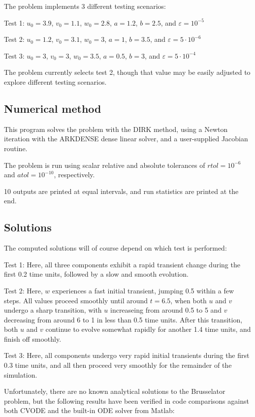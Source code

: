 \documentclass[letterpaper,10pt,english]{sphinxmanual}
\begin{document}
The problem implements 3 different testing scenarios:

Test 1:  \(u_0=3.9\),  \(v_0=1.1\),  \(w_0=2.8\),
\(a=1.2\), \(b=2.5\), and \(\varepsilon=10^{-5}\)

Test 2:  \(u_0=1.2\), \(v_0=3.1\), \(w_0=3\), \(a=1\),
\(b=3.5\), and \(\varepsilon=5\cdot10^{-6}\)

Test 3:  \(u_0=3\), \(v_0=3\), \(w_0=3.5\), \(a=0.5\),
\(b=3\), and \(\varepsilon=5\cdot10^{-4}\)

The problem currently selects test 2, though that value may be easily
adjusted to explore different testing scenarios.


\subsection{Numerical method}
\label{c_serial:id6}
This program solves the problem with the DIRK method, using a
Newton iteration with the ARKDENSE dense linear solver, and a
user-supplied Jacobian routine.

The problem is run using scalar relative and absolute tolerances of
\(rtol=10^{-6}\) and \(atol=10^{-10}\), respectively.

10 outputs are printed at equal intervals, and run statistics
are printed at the end.


\subsection{Solutions}
\label{c_serial:id7}
The computed solutions will of course depend on which test is
performed:

Test 1:  Here, all three components exhibit a rapid transient change
during the first 0.2 time units, followed by a slow and smooth evolution.

Test 2: Here, \(w\) experiences a fast initial transient, jumping
0.5 within a few steps.  All values proceed smoothly until around
\(t=6.5\), when both \(u\) and \(v\) undergo a sharp
transition, with \(u\) increaseing from around 0.5 to 5 and
\(v\) decreasing from around 6 to 1 in less than 0.5 time units.
After this transition, both \(u\) and \(v\) continue to evolve
somewhat rapidly for another 1.4 time units, and finish off smoothly.

Test 3: Here, all components undergo very rapid initial transients
during the first 0.3 time units, and all then proceed very smoothly
for the remainder of the simulation.

Unfortunately, there are no known analytical solutions to the
Brusselator problem, but the following results have been verified
in code comparisons against both CVODE and the built-in ODE solver
 from Matlab:
\end{document}
